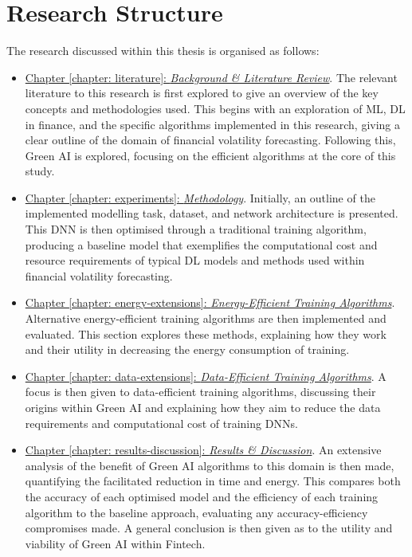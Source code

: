 \documentclass[a4paper, 11pt]{report}
\begin{document}
    \section{Research Structure}
    \label{section: structure}

    The research discussed within this thesis is organised as follows: 

    \begin{itemize}
        \item \underline{Chapter \ref{chapter: literature}: \emph{Background \& Literature Review}}. The relevant literature to this research is first explored to give an overview of the key concepts and methodologies used. This begins with an exploration of ML, DL in finance, and the specific algorithms implemented in this research, giving a clear outline of the domain of financial volatility forecasting. Following this, Green AI is explored, focusing on the efficient algorithms at the core of this study.
        
        \item \underline{Chapter \ref{chapter: experiments}: \emph{Methodology}}. Initially, an outline of the implemented modelling task, dataset, and network architecture is presented. This DNN is then optimised through a traditional training algorithm, producing a baseline model that exemplifies the computational cost and resource requirements of typical DL models and methods used within financial volatility forecasting.

        \item \underline{Chapter \ref{chapter: energy-extensions}: \emph{Energy-Efficient Training Algorithms}}. Alternative energy-efficient training algorithms are then implemented and evaluated. This section explores these methods, explaining how they work and their utility in decreasing the energy consumption of training.
        
        \item \underline{Chapter \ref{chapter: data-extensions}: \emph{Data-Efficient Training Algorithms}}. A focus is then given to data-efficient training algorithms, discussing their origins within Green AI and explaining how they aim to reduce the data requirements and computational cost of training DNNs.
        
        \item \underline{Chapter \ref{chapter: results-discussion}: \emph{Results \& Discussion}}. An extensive analysis of the benefit of Green AI algorithms to this domain is then made, quantifying the facilitated reduction in time and energy. This compares both the accuracy of each optimised model and the efficiency of each training algorithm to the baseline approach, evaluating any accuracy-efficiency compromises made. A general conclusion is then given as to the utility and viability of Green AI within Fintech.
    \end{itemize}
\end{document}
